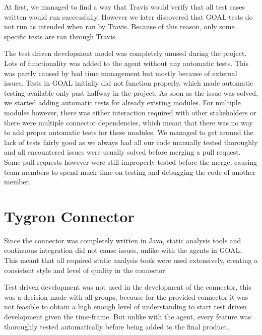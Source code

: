 At first, we managed to find a way that Travis would verify that all test cases written would run successfully. However we later discovered that GOAL-tests do not run as intended when ran by Travis. 
Because of this reason, only some specific tests are ran through Travis. 

The test driven development model was completely unused during the project. Lots of functionality was added to the agent without any automatic tests. This was partly caused by bad time management but mostly because of external issues. Tests in GOAL initially did not function properly, which made automatic testing available only past halfway in the project. As soon as the issue was solved, we started adding automatic tests for already existing modules. For multiple modules however, there was either interaction required with other stakeholders or there were multiple connector dependencies, which meant that there was no way to add proper automatic tests for these modules. We managed to get around the lack of tests fairly good as we always had all our code manually tested thoroughly and all encountered issues were usually solved before merging a pull request. Some pull requests however were still improperly tested before the merge, causing team members to spend much time on testing and debugging the code of another member. 

\section{Tygron Connector}
\label{sec:Tygron Connector}

Since the connector was completely written in Java, static analysis tools and continuous integration did not cause issues, unlike with the agents in GOAL. This meant that all required static analysis tools were used extensively, creating a consistent style and level of quality in the connector.

Test driven development was not used in the development of the connector, this was a decision made with all groups, because for the provided connector it was not feasible to obtain a high enough level of understanding to start test driven development given the time-frame. But unlike with the agent, every feature was thoroughly tested automatically before being added to the final product.

